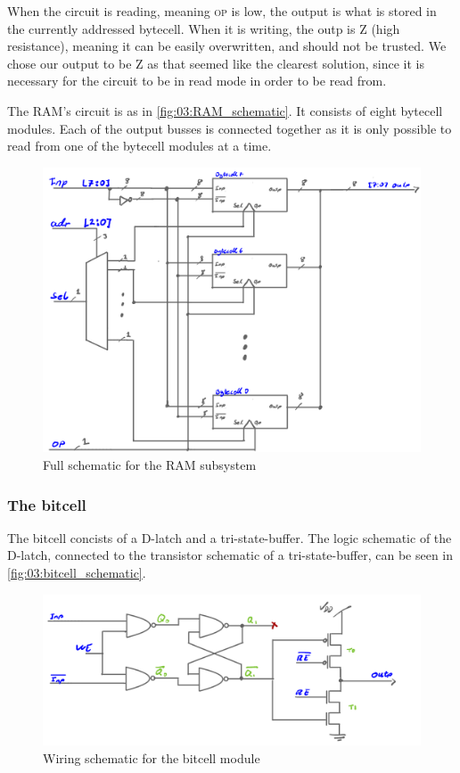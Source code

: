 When the circuit is reading, meaning \textsc{op} is low, the output is what is stored in the currently addressed bytecell. When it is writing, the outp is Z (high resistance), meaning it can be easily overwritten, and should not be trusted. We chose our output to be Z as that seemed like the clearest solution, since it is necessary for the circuit to be in read mode in order to be read from.

The RAM's circuit is as in \autoref{fig:03:RAM_schematic}. It consists of eight bytecell modules. Each of the output busses is connected together as it is only possible to read from one of the bytecell modules at a time.

\begin{figure}
    \centering
    \includegraphics[width=0.8\linewidth]{LaTeX_2/Figures/ram_schematic.png}
    \caption{Full schematic for the RAM subsystem}
    \label{fig:03:RAM_schematic}
\end{figure}


\subsubsection{The bitcell}
The bitcell concists of a D-latch and a tri-state-buffer. The logic schematic of the D-latch, connected to the transistor schematic of a tri-state-buffer, can be seen in \autoref{fig:03:bitcell_schematic}.

\begin{figure}[H]
    \centering
    \includegraphics[width=0.8\linewidth]{LaTeX_2/Figures/bitcell_schematic.png}
    \caption{Wiring schematic for the bitcell module}
    \label{fig:03:bitcell_schematic}
\end{figure}

